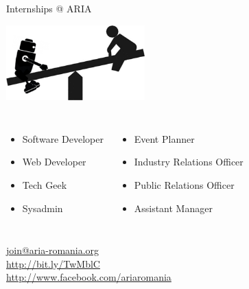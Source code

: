 \documentclass{beamer}
\begin{document}
\begin{frame}[t]
	\begin{center}
		\Huge{Internships @ ARIA}\\%
	\end{center}
	
	\begin{center}
		\includegraphics[width=0.4\textwidth]{graphics/intro/robo-swing}%
	\end{center}%
	
	\begin{columns}[h]
		\small
		\begin{itemize}
			\setlength{\itemsep}{-0.25em}
			\item Software Developer
			\item Web Developer
			\item Tech Geek
			\item Sysadmin
		\end{itemize}
		\vspace*{-1.0em}
		\begin{itemize}
			\setlength{\itemsep}{-0.25em}
			\item Event Planner
			\item Industry Relations Officer
			\item Public Relations Officer
			\item Assistant Manager
		\end{itemize}
	\end{columns}
	
	\begin{center}
		\url{join@aria-romania.org}\\%
		\url{http://bit.ly/TwMblC}\\%
		\url{http://www.facebook.com/ariaromania}
	\end{center}
\end{frame}
\end{document}
